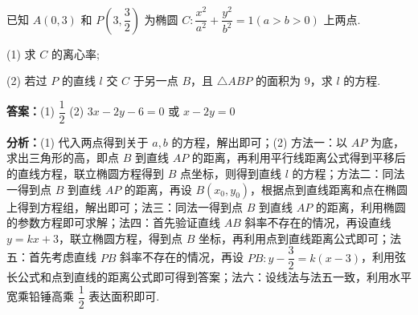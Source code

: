 \begin{question}[points=15]
已知 $A(0,3)$ 和 $P\left(3,\dfrac{3}{2}\right)$ 为椭圆 $C:\dfrac{x^2}{a^2}+\dfrac{y^2}{b^2}=1(a>b>0)$ 上两点.

(1) 求 $C$ 的离心率;

(2) 若过 $P$ 的直线 $l$ 交 $C$ 于另一点 $B$，且 $\triangle ABP$ 的面积为 $9$，求 $l$ 的方程.
\begin{solution}
\textbf{答案：}(1) $\dfrac{1}{2}$ (2) $3x-2y-6=0$ 或 $x-2y=0$

\textbf{分析：}(1) 代入两点得到关于 $a,b$ 的方程，解出即可；(2) 方法一：以 $AP$ 为底，求出三角形的高，即点 $B$ 到直线 $AP$ 的距离，再利用平行线距离公式得到平移后的直线方程，联立椭圆方程得到 $B$ 点坐标，则得到直线 $l$ 的方程；方法二：同法一得到点 $B$ 到直线 $AP$ 的距离，再设 $B(x_0,y_0)$，根据点到直线距离和点在椭圆上得到方程组，解出即可；法三：同法一得到点 $B$ 到直线 $AP$ 的距离，利用椭圆的参数方程即可求解；法四：首先验证直线 $AB$ 斜率不存在的情况，再设直线 $y=kx+3$，联立椭圆方程，得到点 $B$ 坐标，再利用点到直线距离公式即可；法五：首先考虑直线 $PB$ 斜率不存在的情况，再设 $PB: y-\dfrac{3}{2}=k(x-3)$，利用弦长公式和点到直线的距离公式即可得到答案；法六：设线法与法五一致，利用水平宽乘铅锤高乘 $\dfrac{1}{2}$ 表达面积即可.


\end{solution}
\end{question}
